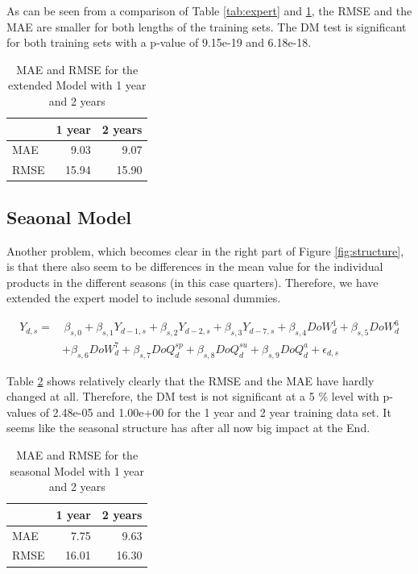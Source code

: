 \documentclass[12pt,a4paper]{article}
\begin{document}
As can be seen from a comparison of Table \ref{tab:expert} and
\ref{tab:extension}, the RMSE and the MAE are smaller for both lengths
of the training sets. The DM test is significant for both training sets
with a p-value of 9.15e-19 and 6.18e-18.

\begin{table}[!h]

\caption{\label{tab:extended model}\label{tab:extension} MAE and RMSE for the extended Model with 1 year and 2 years }
\centering
\begin{tabular}{lrr}
\toprule
  & 1 year &  2 years\\
\midrule
\rowcolor{gray!6}  MAE & 9.03 & 9.07\\
RMSE & 15.94 & 15.90\\
\bottomrule
\end{tabular}
\end{table}

\hypertarget{seaonal-model}{%
\subsection{Seaonal Model}\label{seaonal-model}}

Another problem, which becomes clear in the right part of Figure
\ref{fig:structure}, is that there also seem to be differences in the
mean value for the individual products in the different seasons (in this
case quarters). Therefore, we have extended the expert model to include
sesonal dummies.

\begin{align*}
 Y_{d,s} = &  \, \beta_{s,0 } + \beta_{s,1 } Y_{ d-1,s} + \beta_{s,2 } Y_{ d-2,s} + \beta_{s,3 } Y_{ d-7,s} + \beta_{s,4 } DoW^1_{d}  + \beta_{s,5 } DoW^6_{d}  \\ 
  & + \beta_{s,6 } DoW^7_{d} + \beta_{s,7 } DoQ^{sp}_{d} + \beta_{s,8 } DoQ^{su}_{d} + \beta_{s,9 } DoQ^a_{d} + \epsilon_{d,s}
\end{align*}

Table \ref{tab:seasonal} shows relatively clearly that the \ac{RMSE} and
the \ac{MAE} have hardly changed at all. Therefore, the \ac{DM} test is
not significant at a 5 \% level with p-values of 2.48e-05 and 1.00e+00
for the 1 year and 2 year training data set. It seems like the seasonal
structure has after all now big impact at the End.

\begin{table}[!h]

\caption{\label{tab:seasonal model}\label{tab:seasonal} MAE and RMSE for the seasonal Model with 1 year and 2 years }
\centering
\begin{tabular}{lrr}
\toprule
  & 1 year &  2 years\\
\midrule
\rowcolor{gray!6}  MAE & 7.75 & 9.63\\
RMSE & 16.01 & 16.30\\
\bottomrule
\end{tabular}
\end{table}
\end{document}
